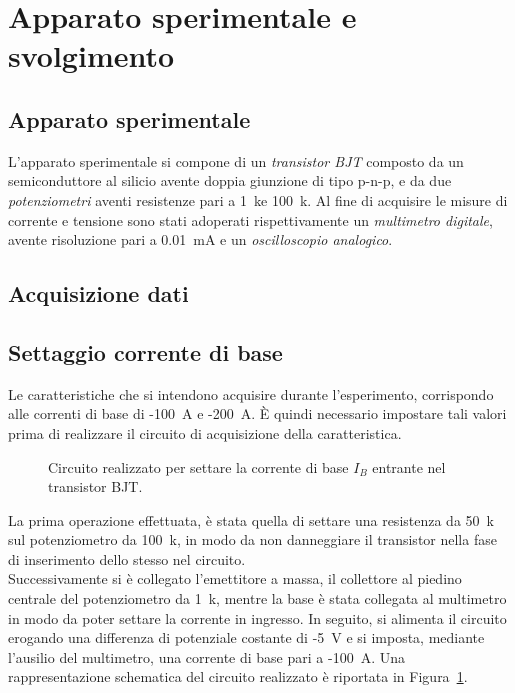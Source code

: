 \documentclass[../main.tex]{subfiles}
\begin{document}
    \section{Apparato sperimentale e svolgimento} \label{sec:acquisizione}

    \subsection{Apparato sperimentale}\label{subsec:apparato-sperimentale}

    L'apparato sperimentale si compone di un \textit{transistor BJT} composto da un
    semiconduttore al silicio avente doppia giunzione di tipo p-n-p, e da due
    \textit{potenziometri} aventi resistenze pari a 1~k\textohm\;e 100~k\textohm.
    Al fine di acquisire le misure di corrente e tensione sono stati adoperati
    rispettivamente un \textit{multimetro digitale}, avente risoluzione pari a
    0.01~mA e un \textit{oscilloscopio analogico}.
    \newpage

    \subsection{Acquisizione dati}\label{subsec:acquisizione-dati}
    \vspace{0.2cm}
    \subsection*{Settaggio corrente di base}

    Le caratteristiche che si intendono acquisire durante l'esperimento,
    corrispondo alle correnti di base di -100~\textmu A e -200~\textmu A.
    È quindi necessario impostare tali valori prima di realizzare il circuito
    di acquisizione della caratteristica.

    \begin{figure}[h!]
        \centering
        
        \caption{Circuito realizzato per settare la corrente di base $I_B$ entrante nel transistor BJT.}
        \label{fig:circuito-corrente-base}
    \end{figure}

    \noindent La prima operazione effettuata, è stata quella di settare
    una resistenza da 50~k\textohm\; sul potenziometro da 100~k\textohm,
    in modo da non danneggiare il transistor nella fase di inserimento dello stesso nel circuito. \\
    Successivamente si è collegato l'emettitore a massa, il collettore al piedino centrale
    del potenziometro da 1~k\textohm, mentre la base è stata collegata al multimetro
    in modo da poter settare la corrente in ingresso.
    In seguito, si alimenta il circuito erogando una differenza di potenziale
    costante di -5~V e si imposta, mediante l'ausilio del multimetro,
    una corrente di base pari a -100~\textmu A.
    Una rappresentazione schematica del circuito realizzato è riportata
    in Figura~\ref{fig:circuito-corrente-base}.
\end{document}
